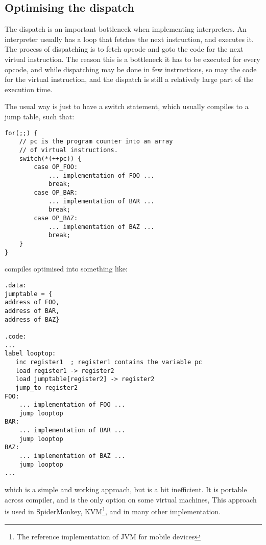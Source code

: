 \documentclass[11pt]{report}
\begin{document}
\subsection{Optimising the dispatch}
The dispatch is an important bottleneck when implementing interpreters.
An interpreter usually has a loop that fetches the next instruction, and executes it. The process of dispatching is to fetch opcode and goto the code for the next virtual instruction.
The reason this is a bottleneck it has to be executed for every opcode, and while dispatching may be done in few instructions, so may the code for the virtual instruction, and the dispatch is still a relatively large part of the execution time. 

The usual way is just to have a switch statement, which usually compiles to a jump table, such that:
\begin{verbatim}
for(;;) {
    // pc is the program counter into an array
    // of virtual instructions.
    switch(*(++pc)) { 
        case OP_FOO:
            ... implementation of FOO ...
            break; 
        case OP_BAR:
            ... implementation of BAR ...
            break; 
        case OP_BAZ:
            ... implementation of BAZ ...
            break; 
    }
}
\end{verbatim}
compiles optimised into something like:
\begin{verbatim}
.data:
jumptable = {
address of FOO,
address of BAR,
address of BAZ}

.code:
...
label looptop:
   inc register1  ; register1 contains the variable pc
   load register1 -> register2
   load jumptable[register2] -> register2
   jump_to register2
FOO:
    ... implementation of FOO ...
    jump looptop
BAR:
    ... implementation of BAR ...
    jump looptop
BAZ:
    ... implementation of BAZ ...
    jump looptop
...
\end{verbatim}
which is a simple and working approach, but is a bit inefficient. It is portable across compiler, and is the only option on some virtual machines,
This approach is used in SpiderMonkey, KVM\footnote{The reference implementation of JVM for mobile devices}, and in many other implementation.
\end{document}
